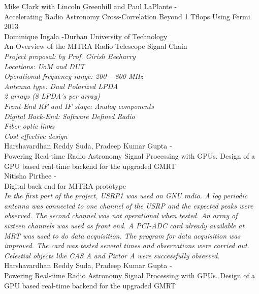 \noindent
{\large Mike Clark with Lincoln Greenhill and Paul LaPlante - \hfill \\ Accelerating Radio Astronomy Cross-Correlation Beyond 1 Tflops Using Fermi }\\


\noindent
{\large 2013}\\
\noindent
{\large Dominique Ingala -Durban University of Technology \hfill \\ An Overview of the MITRA Radio Telescope
Signal Chain  }\\
\indent \textit{Project proposal: by Prof. Girish Beeharry\\
Locations: UoM and DUT\\
Operational frequency range: 200 – 800 MHz\\
Antenna type: Dual Polarized LPDA\\
2 arrays (8 LPDA’s per array)\\
Front-End RF and IF stage: Analog components\\
Digital Back-End: Software Defined Radio\\
Fiber optic links\\
Cost effective design
}\\

\noindent
{\large Harshavardhan Reddy Suda, Pradeep Kumar Gupta - \hfill \\ Powering Real-time Radio Astronomy Signal Processing with GPUs. Design of a GPU based real-time backend for the upgraded GMRT  }\\

\noindent
{\large Nitisha Pirthee - \hfill \\ Digital back end for MITRA prototype}\\
\indent \textit{In the first part of the project, USRP1 was used on GNU radio. A log periodic antenna was connected to one channel of the USRP and the expected peaks were observed. The second channel was not operational when tested. An array of sixteen channels was used as front end. A PCI-ADC card already available at MRT was used to do data acquisition. The program for data acquisition was improved. The card was tested several times and observations were carried out. Celestial objects like CAS A and Pictor A were successfully observed.
}\\

\noindent
{\large Harshavardhan Reddy Suda, Pradeep Kumar Gupta - \hfill \\ Powering Real-time Radio Astronomy Signal Processing with GPUs. Design of a GPU based real-time backend for the upgraded GMRT  }\\

